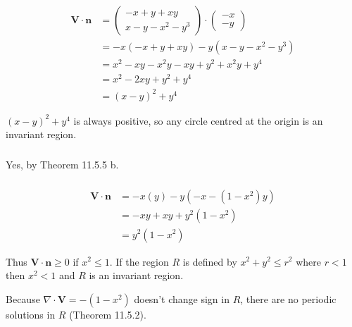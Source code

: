 \documentclass{article}
\begin{document}
\begin{align*}
  \mathbf{V} \cdot \mathbf{n} & = \begin{pmatrix}
                                    -x + y + x y \\
                                    x - y - x^2 - y^3
                                  \end{pmatrix} \cdot \begin{pmatrix}
                                                        -x \\
                                                        -y
                                                      \end{pmatrix}          \\
                              & = -x (-x + y + x y) - y (x - y - x^2 - y^3)   \\
                              & = x^2 - x y - x^2 y - x y + y^2 + x^2 y + y^4 \\
                              & = x^2 - 2 x y + y^2 + y^4                     \\
                              & = (x - y)^2 + y^4
\end{align*}

$(x - y)^2 + y^4$ is always positive, so any circle centred at the origin is an invariant region.

\setcounter{subsubsection}{16}
\subsubsection{}

Yes, by Theorem 11.5.5 b.

\setcounter{subsubsection}{18}
\subsubsection{}

\begin{align*}
  \mathbf{V} \cdot \mathbf{n} & = -x (y) - y (-x - (1 - x^2) y) \\
                              & = -x y + x y + y^2 (1 - x^2)    \\
                              & = y^2 (1 - x^2)
\end{align*}

Thus $\mathbf{V} \cdot \mathbf{n} \ge 0$ if $x^2 \le 1$. If the region $R$ is defined by $x^2 + y^2 \le r^2$ where $r < 1$ then $x^2 < 1$ and $R$ is an invariant region.

Because $\nabla \cdot \mathbf{V} = -(1 - x^2)$ doesn't change sign in $R$, there are no periodic solutions in $R$ (Theorem 11.5.2).
\end{document}
